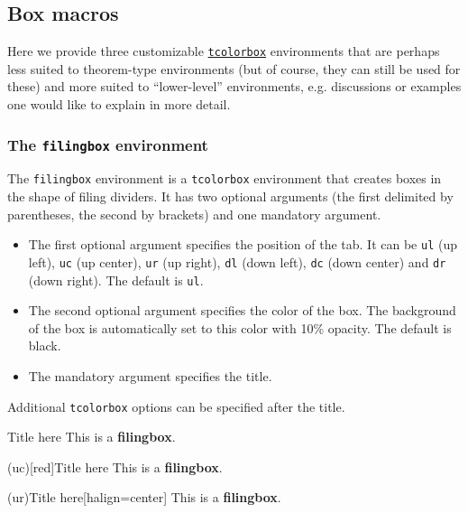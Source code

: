 \documentclass[10pt]{extarticle}
\newcommand{\<}{\langle}
\renewcommand{\>}{\rangle}
\theoremstyle{mystyle}{\newtheorem*{remark}{Remark}}
\theoremstyle{mystyle}{\newtheorem*{remarks}{Remarks}}
\theoremstyle{mystyle}{\newtheorem*{example}{Example}}
\theoremstyle{mystyle}{\newtheorem*{examples}{Examples}}
\theoremstyle{definition}{\newtheorem*{exercise}{Exercise}}
\theoremstyle{warn}
\begin{document}
\subsection{Box macros}

Here we provide three customizable \href{https://ctan.org/pkg/tcolorbox}{\texttt{tcolorbox}} environments that are perhaps less suited to theorem-type environments (but of course, they can still be used for these) and more suited to ``lower-level'' environments, e.g. discussions or examples one would like to explain in more detail.

\subsubsection*{The \texttt{filingbox} environment}

The \texttt{filingbox} environment is a \texttt{tcolorbox} environment that creates boxes in the shape of filing dividers. It has two optional arguments (the first delimited by parentheses, the second by brackets) and one mandatory argument.
\begin{itemize}
    \item The first optional argument specifies the position of the tab. It can be \texttt{ul} (up left), \texttt{uc} (up center), \texttt{ur} (up right), \texttt{dl} (down left), \texttt{dc} (down center) and \texttt{dr} (down right). The default is \texttt{ul}.
    \item The second optional argument specifies the color of the box. The background of the box is automatically set to this color with 10\% opacity. The default is black.
    \item The mandatory argument specifies the title.
\end{itemize}
Additional \texttt{tcolorbox} options can be specified after the title.

\begin{verbbox}
\begin{filingbox}{Title here}
This is a \textbf{filingbox}.
\end{filingbox}
\end{verbbox}

\begin{verbbox}
\begin{filingbox}(uc)[red]{Title here}
This is a \textbf{filingbox}.
\end{filingbox}
\end{verbbox}

\begin{verbbox}
\begin{filingbox}(ur){Title here}[halign=center]
This is a \textbf{filingbox}.
\end{filingbox}
\end{verbbox}
\end{document}
